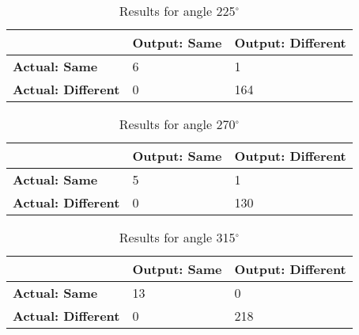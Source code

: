 \begin{table}[H]
    \centering
	\begin{spacing}{1.5}    
    \begin{tabular}{|l|l|l|}
        \hline
        \cellcolor{gray} & \textbf{Output: Same} & \textbf{Output: Different} \\ [0.5ex]
        \hline\hline
        \textbf{Actual: Same} & 6 & 1 \\ [0.5ex]
        \hline
        \textbf{Actual: Different} & 0 & 164 \\ [0.5ex]
        \hline
    \end{tabular}
    \end{spacing}
    \caption{Results for angle 225$^{\circ}$}
\end{table}
            
\begin{table}[H]
    \centering
	\begin{spacing}{1.5}    
    \begin{tabular}{|l|l|l|}
        \hline
        \cellcolor{gray} & \textbf{Output: Same} & \textbf{Output: Different} \\ [0.5ex]
        \hline\hline
        \textbf{Actual: Same} & 5 & 1 \\ [0.5ex]
        \hline
        \textbf{Actual: Different} & 0 & 130 \\ [0.5ex]
        \hline
    \end{tabular}
    \end{spacing}
    \caption{Results for angle 270$^{\circ}$}
\end{table}
            
\begin{table}[H]
    \centering
	\begin{spacing}{1.5}    
    \begin{tabular}{|l|l|l|}
        \hline
        \cellcolor{gray} & \textbf{Output: Same} & \textbf{Output: Different} \\ [0.5ex]
        \hline\hline
        \textbf{Actual: Same} & 13 & 0 \\ [0.5ex]
        \hline
        \textbf{Actual: Different} & 0 & 218 \\ [0.5ex]
        \hline
    \end{tabular}
    \end{spacing}
    \caption{Results for angle 315$^{\circ}$}
    \label{tab:results_angle_315}
\end{table}
            
